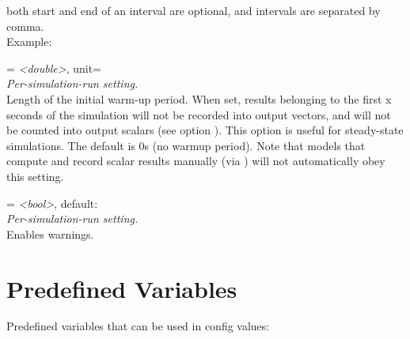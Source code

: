 \begin{description}
    both start and end of an interval are optional, and intervals are separated
    by comma.\\
    Example:
\item[warmup-period] = \textit{<double>}, unit=\\
    \textit{Per-simulation-run setting.}\\
    Length of the initial warm-up period. When set, results belonging to the
    first x seconds of the simulation will not be recorded into output vectors,
    and will not be counted into output scalars (see option
    ).
    This option is useful for steady-state simulations. The default is 0s (no
    warmup period). Note that models that compute and record scalar results
    manually (via ) will not automatically obey this
    setting.
\item[warnings] = \textit{<bool>}, default: \\
    \textit{Per-simulation-run setting.}\\
    Enables warnings.
\end{description}

\section{Predefined Variables}
\label{sec:config-options:predefined-variables}

Predefined variables that can be used in config values:

